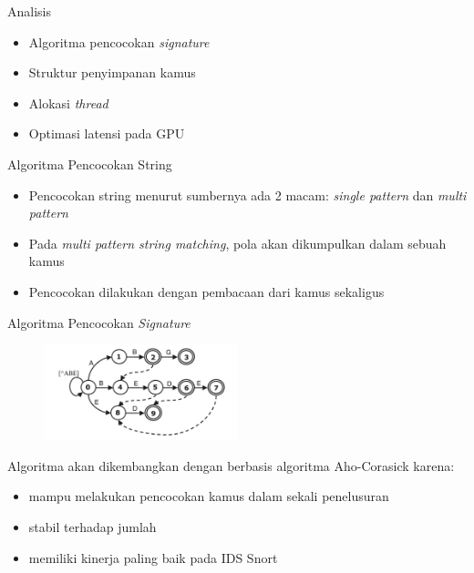 \documentclass[10pt,xcolor=table]{beamer}
\begin{document}
\begin{frame}{Analisis}
    \begin{itemize}

        \item Algoritma pencocokan \emph{signature}

        \item Struktur penyimpanan kamus

        \item Alokasi \emph{thread}

        \item Optimasi latensi pada GPU

    \end{itemize}
\end{frame}

\begin{frame}[fragile]{Algoritma Pencocokan String}
    \begin{itemize}

        \item Pencocokan string menurut sumbernya ada 2 macam: \emph{single pattern} dan \emph{multi pattern}

        \item Pada \emph{multi pattern string matching}, pola akan dikumpulkan dalam sebuah kamus
    
        \item Pencocokan dilakukan dengan pembacaan dari kamus sekaligus

    \end{itemize}
\end{frame}

\begin{frame}{Algoritma Pencocokan \emph{Signature}}
    \begin{figure}
        \centering
        \includegraphics[width=0.5\textwidth]{../src/resources/aho-c.png}
    \end{figure}

    Algoritma akan dikembangkan dengan berbasis algoritma Aho-Corasick karena:
    \begin{itemize}
        \item mampu melakukan pencocokan kamus dalam sekali penelusuran
        \item stabil terhadap jumlah 
        \item memiliki kinerja paling baik pada IDS Snort
    \end{itemize}
\end{frame}
\end{document}
